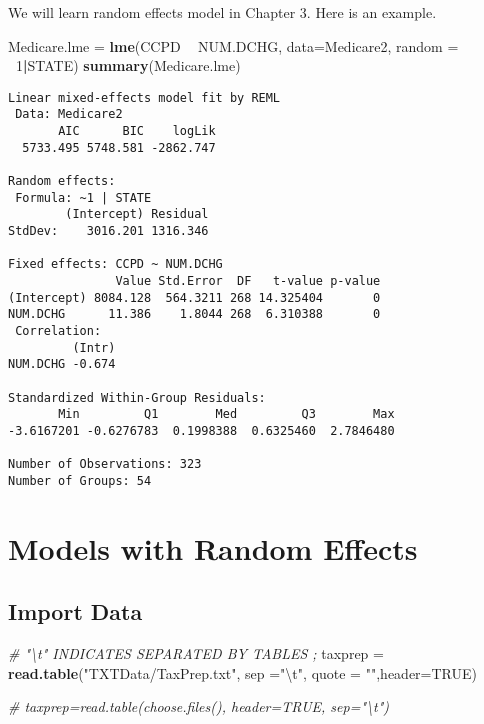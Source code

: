 \documentclass[]{book}
\newenvironment{Shaded}{\begin{snugshade}}{\end{snugshade}}
\newcommand{\CharTok}[1]{\textcolor[rgb]{0.31,0.60,0.02}{#1}}
\newcommand{\CommentTok}[1]{\textcolor[rgb]{0.56,0.35,0.01}{\textit{#1}}}
\newcommand{\DataTypeTok}[1]{\textcolor[rgb]{0.13,0.29,0.53}{#1}}
\newcommand{\DecValTok}[1]{\textcolor[rgb]{0.00,0.00,0.81}{#1}}
\newcommand{\KeywordTok}[1]{\textcolor[rgb]{0.13,0.29,0.53}{\textbf{#1}}}
\newcommand{\NormalTok}[1]{#1}
\newcommand{\OperatorTok}[1]{\textcolor[rgb]{0.81,0.36,0.00}{\textbf{#1}}}
\newcommand{\OtherTok}[1]{\textcolor[rgb]{0.56,0.35,0.01}{#1}}
\newcommand{\StringTok}[1]{\textcolor[rgb]{0.31,0.60,0.02}{#1}}
\begin{document}
We will learn random effects model in Chapter 3. Here is an example.

\begin{Shaded}
\begin{Highlighting}[]
\NormalTok{Medicare.lme =}\StringTok{ }\KeywordTok{lme}\NormalTok{(CCPD }\OperatorTok{~}\StringTok{ }\NormalTok{NUM.DCHG, }\DataTypeTok{data=}\NormalTok{Medicare2, }\DataTypeTok{random =} \OperatorTok{~}\DecValTok{1}\OperatorTok{|}\NormalTok{STATE)}
\KeywordTok{summary}\NormalTok{(Medicare.lme)}
\end{Highlighting}
\end{Shaded}

\begin{verbatim}
Linear mixed-effects model fit by REML
 Data: Medicare2 
       AIC      BIC    logLik
  5733.495 5748.581 -2862.747

Random effects:
 Formula: ~1 | STATE
        (Intercept) Residual
StdDev:    3016.201 1316.346

Fixed effects: CCPD ~ NUM.DCHG 
               Value Std.Error  DF   t-value p-value
(Intercept) 8084.128  564.3211 268 14.325404       0
NUM.DCHG      11.386    1.8044 268  6.310388       0
 Correlation: 
         (Intr)
NUM.DCHG -0.674

Standardized Within-Group Residuals:
       Min         Q1        Med         Q3        Max 
-3.6167201 -0.6276783  0.1998388  0.6325460  2.7846480 

Number of Observations: 323
Number of Groups: 54 
\end{verbatim}

\hypertarget{models-with-random-effects}{%
\chapter{Models with Random Effects}\label{models-with-random-effects}}

\hypertarget{import-data-2}{%
\section{Import Data}\label{import-data-2}}

\begin{Shaded}
\begin{Highlighting}[]
\CommentTok{#  "\textbackslash{}t"  INDICATES SEPARATED BY TABLES  ;}
\NormalTok{taxprep  =}\StringTok{ }\KeywordTok{read.table}\NormalTok{(}\StringTok{"TXTData/TaxPrep.txt"}\NormalTok{, }\DataTypeTok{sep =}\StringTok{"}\CharTok{\textbackslash{}t}\StringTok{"}\NormalTok{, }\DataTypeTok{quote =} \StringTok{""}\NormalTok{,}\DataTypeTok{header=}\OtherTok{TRUE}\NormalTok{)}

\CommentTok{# taxprep=read.table(choose.files(), header=TRUE, sep="\textbackslash{}t")}
\end{Highlighting}
\end{Shaded}
\end{document}
